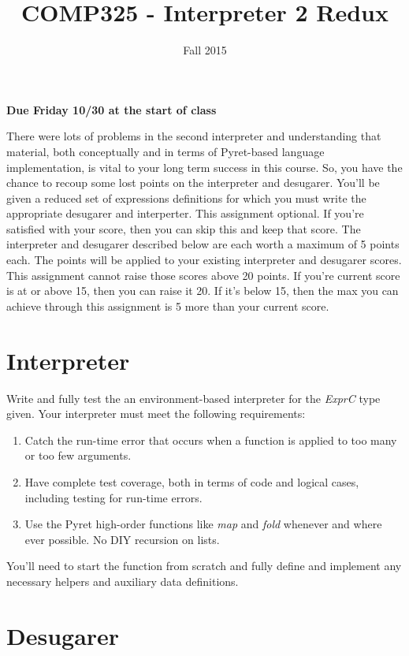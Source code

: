 \documentclass[10pt]{article}
\title{COMP325 - Interpreter 2 Redux}
\author{}
\date{Fall 2015}
\begin{document}
\maketitle
\thispagestyle{empty}

\begin{center}
\textbf{Due Friday 10/30 at the start of class}
\end{center}

There were lots of problems in the second interpreter and understanding that material, both conceptually and in terms of Pyret-based language implementation, is vital to your long term success in this course. So, you have the chance to recoup some lost points on the interpreter and desugarer. You'll be given a reduced set of expressions definitions for which you must write the appropriate desugarer and interperter. This assignment optional. If you're satisfied with your score, then you can skip this and keep that score. The interpreter and desugarer described below are each worth a maximum of 5 points each. The points will be applied to your existing interpreter and desugarer scores. This assignment cannot raise those scores above 20 points. If you're current score is at or above 15, then you can raise it 20. If it's below 15, then the max you can achieve through this assignment is 5 more than your current score. 

\section{Interpreter}

Write and fully test the an environment-based interpreter for the \textit{ExprC} type given. Your interpreter must meet the following requirements:
\begin{enumerate}
\item Catch the run-time error that occurs when a function is applied to too many or too few arguments. 
\item Have complete test coverage, both in terms of code and logical cases, including testing for run-time errors.
\item Use the Pyret high-order functions like \textit{map} and \textit{fold} whenever and where ever possible. No DIY recursion on lists.
\end{enumerate}
You'll need to start the function from scratch and fully define and implement any necessary helpers and auxiliary data definitions. 

\section{Desugarer}
\end{document}
